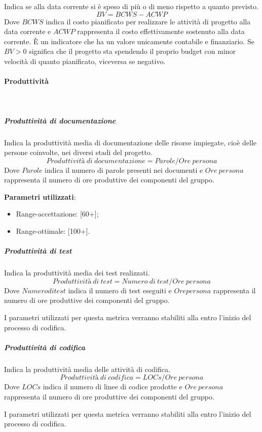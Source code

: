 			Indica se alla data corrente si è speso di più o di meno rispetto a quanto previsto.
			\[
			BV = BCWS - ACWP
			\]
			Dove $BCWS$ indica il costo pianificato per realizzare le attività di  progetto alla  data corrente e $ACWP$ rappresenta il costo effettivamente sostenuto alla data  corrente.
			È un indicatore che ha un valore unicamente contabile e finanziario. Se $BV>0$ significa che il progetto sta spendendo il proprio budget con minor velocità di quanto pianificato, viceversa se negativo.

			\paragraph{Produttività} \mbox{} \\

				\subparagraph{Produttività di documentazione}
				Indica la produttività media di documentazione delle risorse impiegate, cioè delle persone coinvolte, nei diversi stadi del progetto.
				\[
				Produttività\ di\ documentazione = Parole / Ore\ persona
				\]
				Dove $Parole$ indica il numero di parole presenti nei documenti e $Ore\ persona$ rappresenta il numero di ore produttive dei componenti del gruppo.
				
				\textbf{Parametri utilizzati}:
				\begin{itemize}
					\item Range-accettazione: [60+];
					\item Range-ottimale: [100+].
				\end{itemize}

				\subparagraph{Produttività di test}
				Indica la produttività media dei test realizzati.
				\[
				Produttività\ di\ test = Numero\ di\ test / Ore\ persona
				\]
				Dove $Numero di test$ indica il numero di test eseguiti e $Ore persona$ rappresenta il numero di ore produttive dei componenti del gruppo.
				
				I parametri utilizzati per questa metrica verranno stabiliti alla entro l'inizio del processo di codifica.

				\subparagraph{Produttività di codifica}
				Indica la produttività media delle attività di codifica.
				\[
				Produttività\ di\ codifica = LOCs / Ore\ persona
				\]
				Dove $LOCs$ indica il numero di linee di codice prodotte e $Ore\ persona$ rappresenta il numero di ore produttive dei componenti del gruppo.
				
				I parametri utilizzati per questa metrica verranno stabiliti alla entro l'inizio del processo di codifica.

